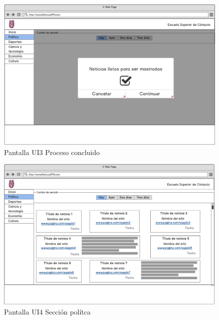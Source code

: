 \begin{figure}[H]
  \centering
	\includegraphics[scale=.35]{imagenes/Pantallas/UI3}
  \caption{Pantalla UI3 Proceso concluido}
  \label{fig:UI3}
\end{figure}
\begin{figure}[H]
  \centering
  \includegraphics[scale=.35]{imagenes/Pantallas/UI4}
  \caption{Pantalla UI4 Sección polítca}
  \label{fig:UI4}
\end{figure}
